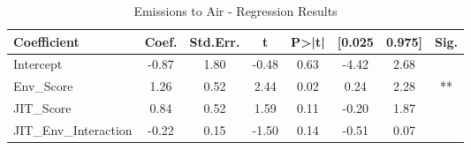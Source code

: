 \begin{table}[htbp]
    \centering
    \caption{Emissions to Air - Regression Results}
    \label{tab:regression}
    \begin{tabular}{lccccccc}
\toprule
Coefficient & Coef. & Std.Err. & t & P>|t| & [0.025 & 0.975] & Sig. \\
\midrule
Intercept & -0.87 & 1.80 & -0.48 & 0.63 & -4.42 & 2.68 &  \\
Env\_Score & 1.26 & 0.52 & 2.44 & 0.02 & 0.24 & 2.28 & ** \\
JIT\_Score & 0.84 & 0.52 & 1.59 & 0.11 & -0.20 & 1.87 &  \\
JIT\_Env\_Interaction & -0.22 & 0.15 & -1.50 & 0.14 & -0.51 & 0.07 &  \\
\bottomrule
\end{tabular}

    \end{table}
    